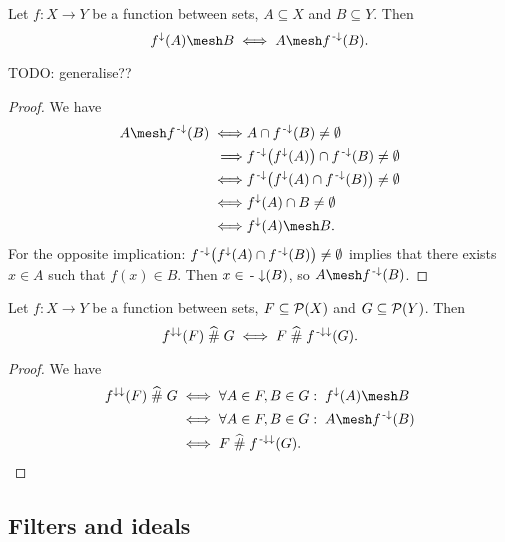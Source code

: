 \begin{proposition} \label{meshConnection}
Let $f:X \to Y$ be a function between sets, $A\subseteq X$ and $B\subseteq Y$. Then
\[ f^{\imf}(A)\mesh B \iff A\mesh f^\preimf(B). \]
\end{proposition}
TODO: generalise??
\begin{proof}
We have
\begin{align*}
A\mesh f^\preimf(B) \iff& A\cap f^\preimf(B) \neq \emptyset \\
\implies& f^{\preimf}\big(f^{\imf}(A)\big) \cap f^\preimf(B) \neq \emptyset \\
\iff& f^{\preimf}\big(f^{\imf}(A) \cap f^\preimf(B)\big) \neq \emptyset \\
\iff& f^{\imf}(A) \cap B \neq \emptyset \\
\iff& f^{\imf}(A)\mesh B.
\end{align*}
For the opposite implication: $f^{{\text{\hspace{0.15em}-}\downarrow}}\big(f^{\downarrow}(A) \cap f^{\text{\hspace{0.15em}-}\downarrow}(B)\big) \neq \emptyset$ implies that there exists $x\in A$ such that $f(x) \in B$. Then $x\in {\text{\hspace{0.15em}-}\downarrow}(B)$, so $A\mesh f^\preimf(B)$.
\end{proof}
\begin{corollary} \label{meshConnectionSetsOfSets}
Let $f:X \to Y$ be a function between sets, $F \subseteq \operatorname{\mathcal{P}}(X)$ and $G\subseteq \operatorname{\mathcal{P}}(Y)$. Then
\[ f^{\downarrow\downarrow}(F) \mathrel{\widehat{\#}} G \iff F \mathrel{\widehat{\#}} f^{{\text{\hspace{0.15em}-}\downarrow}\downarrow}(G). \]
\end{corollary}
\begin{proof}
We have
\begin{align*}
f^{\imf\imf}(F) \amesh G &\iff \forall A\in F, B\in G:\; f^{\imf}(A) \mesh B \\
&\iff \forall A\in F, B\in G:\; A \mesh f^\preimf(B) \\
&\iff F \amesh f^{\preimf\imf}(G).
\end{align*}
\end{proof}


\subsection{Filters and ideals}

